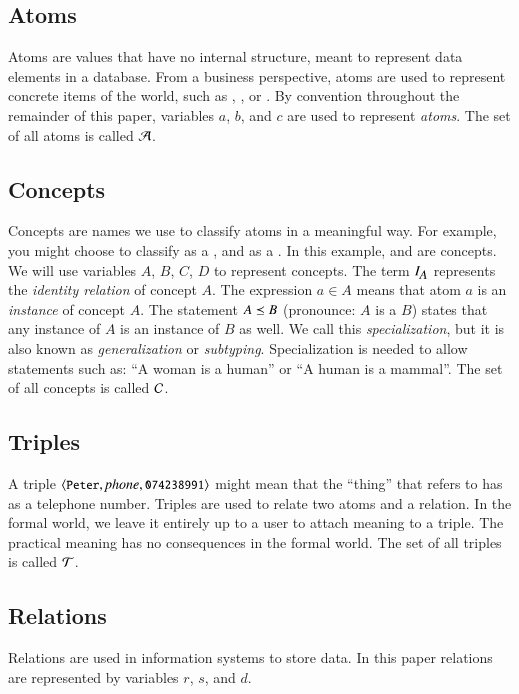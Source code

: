 \documentclass{elsarticle}
\begin{document}
\subsection{Atoms}
	Atoms are values that have no internal structure, meant to represent data elements in a database.
	From a business perspective, atoms are used to represent concrete items of the world,
	such as , , or .
	By convention throughout the remainder of this paper, variables $a$, $b$, and $c$ are used to represent \emph{atoms}.
	The set of all atoms is called $\mathcal{A}$.
	
\subsection{Concepts}
	Concepts are names we use to classify atoms in a meaningful way.
	For example, you might choose to classify  as a , and  as a .
	In this example,  and  are concepts.
    We will use variables $A$, $B$, $C$, $D$ to represent concepts.
	The term $I_{\text{\it \small A\/}}$ represents the \emph{identity relation} of concept $A$.
	The expression $a \in A$ means that atom $a$ is an \emph{instance} of concept $A$.
	The statement $A\preceq B$ (pronounce: $A$ is a $B$) states that any instance of $A$ is an instance of $B$ as well.
	We call this {\em specialization}, but it is also known as {\em generalization} or {\em subtyping}.
	Specialization is needed to allow statements such as: ``A woman is a human'' or ``A human is a mammal''.
	The set of all concepts is called $\mathcal{C}$.
	
\subsection{Triples}
	A triple $\langle{\text{{\tt\small Peter}}},{\text{\it phone\/}},{\text{{\tt\small 074238991}}}\rangle$ might mean that the ``thing'' that  refers to
	has  as a telephone number.
	Triples are used to relate two atoms and a relation.
	In the formal world, we leave it entirely up to a user to attach meaning to a triple.
	The practical meaning has no consequences in the formal world.
	The set of all triples is called $\mathcal{T}$.

\subsection{Relations}
	Relations are used in information systems to store data.
	In this paper relations are represented by variables $r$, $s$, and $d$.
\end{document}
